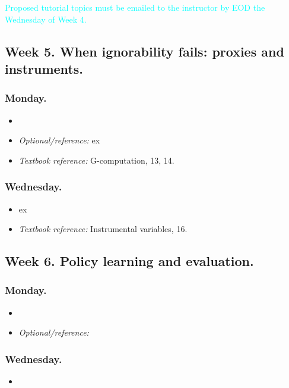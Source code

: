 \documentclass[letterpaper, 12pt, parskip=full,DIV=10]{scrartcl}
\begin{document}
\textcolor{cyan}{Proposed tutorial topics must be emailed to the instructor by EOD the Wednesday of Week 4.}

\subsection*{Week 5. When ignorability fails: proxies and instruments.}
\subsubsection*{Monday.}
\begin{itemize}
\item {}
\item \textit{Optional/reference:}   ex
\item \textit{Textbook reference:}  G-computation, 13, 14. 
\end{itemize}




\subsubsection*{Wednesday.}
\begin{itemize}
\item {} ex
\item \textit{Textbook reference:}  Instrumental variables, 16. 
\end{itemize}

\subsection*{Week 6. Policy learning and evaluation.}
\subsubsection*{Monday.}
\begin{itemize}
\item {}
\item \textit{Optional/reference:}
\end{itemize}


\subsubsection*{Wednesday.}
\begin{itemize}
\item {}
\end{itemize}
\end{document}

